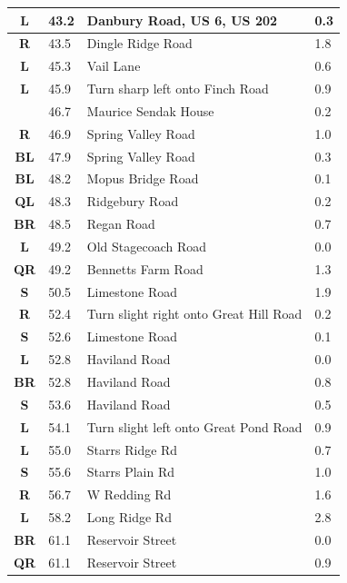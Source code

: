 \documentclass[11pt]{article}
\begin{document}
\begin{center}
\begin{supertabular}{|c|p{0.30in}|p{2.25in}|l|}
 \textbf{L} &  43.2 & Danbury Road, US 6, US 202 &   0.3 \\ \hline
{} \textbf{R} &  43.5 & Dingle Ridge Road &   1.8 \\ \hline
 \textbf{L} &  45.3 & Vail Lane &   0.6 \\ \hline
 \textbf{L} &  45.9 & Turn sharp left onto Finch Road &   0.9 \\ \hline
{} \textbf{} &  46.7 & Maurice Sendak House &   0.2 \\ \hline
{} \textbf{R} &  46.9 & Spring Valley Road &   1.0 \\ \hline
 \textbf{BL} &  47.9 & Spring Valley Road &   0.3 \\ \hline
 \textbf{BL} &  48.2 & Mopus Bridge Road &   0.1 \\ \hline
 \textbf{QL} &  48.3 & Ridgebury Road &   0.2 \\ \hline
{} \textbf{BR} &  48.5 & Regan Road &   0.7 \\ \hline
 \textbf{L} &  49.2 & Old Stagecoach Road &   0.0 \\ \hline
{} \textbf{QR} &  49.2 & Bennetts Farm Road &   1.3 \\ \hline
 \textbf{S} &  50.5 & Limestone Road &   1.9 \\ \hline
{} \textbf{R} &  52.4 & Turn slight right onto Great Hill Road &   0.2 \\ \hline
 \textbf{S} &  52.6 & Limestone Road &   0.1 \\ \hline
 \textbf{L} &  52.8 & Haviland Road &   0.0 \\ \hline
{} \textbf{BR} &  52.8 & Haviland Road &   0.8 \\ \hline
 \textbf{S} &  53.6 & Haviland Road &   0.5 \\ \hline
 \textbf{L} &  54.1 & Turn slight left onto Great Pond Road &   0.9 \\ \hline
 \textbf{L} &  55.0 & Starrs Ridge Rd &   0.7 \\ \hline
 \textbf{S} &  55.6 & Starrs Plain Rd &   1.0 \\ \hline
{} \textbf{R} &  56.7 & W Redding Rd &   1.6 \\ \hline
 \textbf{L} &  58.2 & Long Ridge Rd &   2.8 \\ \hline
{} \textbf{BR} &  61.1 & Reservoir Street &   0.0 \\ \hline
{} \textbf{QR} &  61.1 & Reservoir Street &   0.9 \\ \hline

\end{supertabular}
\end{center}
\end{document}
